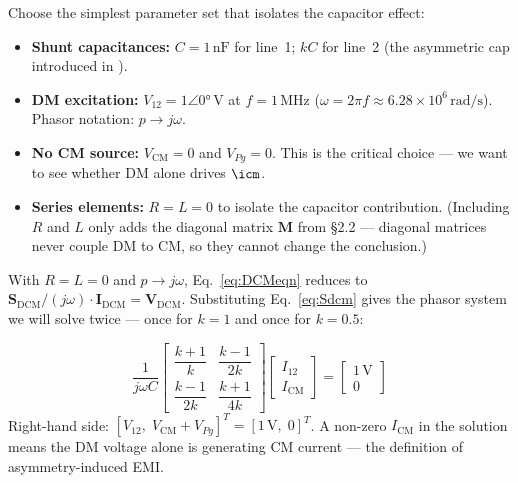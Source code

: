 Choose the simplest parameter set that isolates the capacitor effect:

\begin{itemize}
    \item \textbf{Shunt capacitances:} $C = 1\,\text{nF}$ for
          line~1; $kC$ for line~2 (the asymmetric cap introduced
          in ).
    \item \textbf{DM excitation:} $V_{12} = 1\angle 0°\,\text{V}$
          at $f = 1\,\text{MHz}$ ($\omega = 2\pi f \approx
          6.28 \times 10^6\,\text{rad/s}$).  Phasor notation:
          $p \to j\omega$.
    \item \textbf{No CM source:} $V_{\mathrm{CM}} = 0$ and
          $V_{Pg} = 0$.  This is the critical choice — we want
          to see whether DM alone drives $\icm$.
    \item \textbf{Series elements:} $R = L = 0$ to isolate the
          capacitor contribution.  (Including $R$ and $L$ only
          adds the diagonal matrix $\mathbf{M}$ from \S2.2 —
          diagonal matrices never couple DM to CM, so they
          cannot change the conclusion.)
\end{itemize}

With $R = L = 0$ and $p \to j\omega$, Eq.~\eqref{eq:DCMeqn}
reduces to
$\mathbf{S}_{\mathrm{DCM}}/(j\omega) \cdot \mathbf{I}_{\mathrm{DCM}}
= \mathbf{V}_{\mathrm{DCM}}$.
Substituting Eq.~\eqref{eq:Sdcm} gives the phasor system we will
solve twice — once for $k = 1$ and once for $k = 0.5$:

\begin{eqnbox}
\begin{equation}
\frac{1}{j\omega C}
\begin{bmatrix}
    \dfrac{k+1}{k}  & \dfrac{k-1}{2k} \\[10pt]
    \dfrac{k-1}{2k} & \dfrac{k+1}{4k}
\end{bmatrix}
\begin{bmatrix} I_{12} \\[4pt] I_{\mathrm{CM}} \end{bmatrix}
=
\begin{bmatrix} 1\,\mathrm{V} \\[4pt] 0 \end{bmatrix}
\label{eq:num_sys}
\end{equation}
Right-hand side: $[V_{12},\;V_{\mathrm{CM}}+V_{Pg}]^T = [1\,\mathrm{V},\;0]^T$.
A non-zero $I_{\mathrm{CM}}$ in the solution means the DM voltage
alone is generating CM current — the definition of asymmetry-induced
EMI.
\end{eqnbox}


